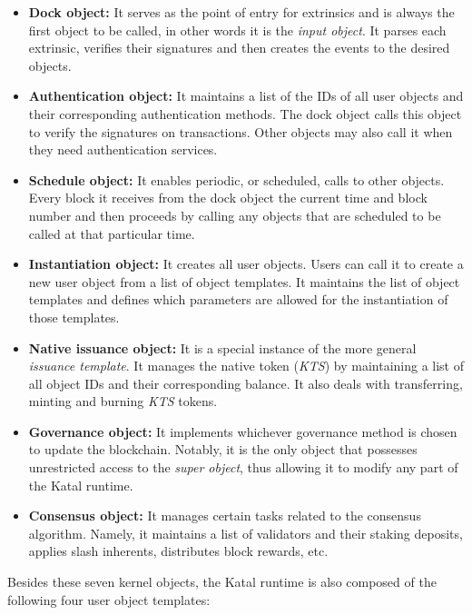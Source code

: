 \documentclass[conference]{IEEEtran}
\begin{document}
\begin{itemize}
	\item \textbf{Dock object:} It serves as the point of entry for extrinsics and is always the first object to be called, in other words it is the \textit{input object}. It parses each extrinsic, verifies their signatures and then creates the events to the desired objects.
	\item \textbf{Authentication object:} It maintains a list of the IDs of all user objects and their corresponding authentication methods. The dock object calls this object to verify the signatures on transactions. Other objects may also call it when they need authentication services.
	\item \textbf{Schedule object:} It enables periodic, or scheduled, calls to other objects. Every block it receives from the dock object the current time and block number and then proceeds by calling any objects that are scheduled to be called at that particular time.
	\item \textbf{Instantiation object:} It creates all user objects. Users can call it to create a new user object from a list of object templates. It maintains the list of object templates and defines which parameters are allowed for the instantiation of those templates.
	\item \textbf{Native issuance object:} It is a special instance of the more general \textit{issuance template}. It manages the native token (\textit{KTS}) by maintaining a list of all object IDs and their corresponding balance. It also deals with transferring, minting and burning \textit{KTS} tokens.
	\item \textbf{Governance object:} It implements whichever governance method is chosen to update the blockchain. Notably, it is the only object that possesses unrestricted access to the \textit{super object}, thus allowing it to modify any part of the Katal runtime.
	\item \textbf{Consensus object:} It manages certain tasks related to the consensus algorithm. Namely, it maintains a list of validators and their staking deposits, applies slash inherents, distributes block rewards, etc.
\end{itemize}

Besides these seven kernel objects, the Katal runtime is also composed of the following four user object templates:
\end{document}
